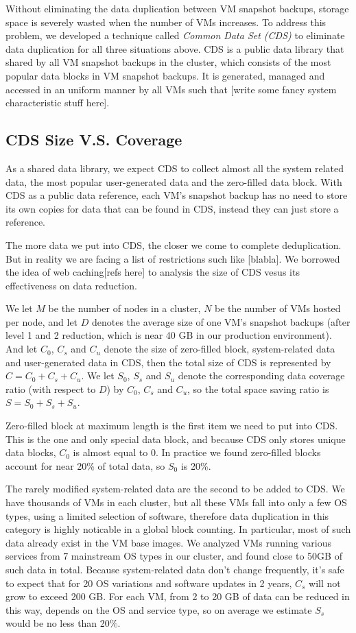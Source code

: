 Without eliminating the data duplication between VM snapshot backups, storage space is severely wasted when the number of VMs increases.
To address this problem, we developed a technique called \emph{Common Data Set (CDS)} to eliminate data duplication for all three situations above. 
CDS is a public data library that shared by all VM snapshot backups in the cluster, 
which consists of the most popular data blocks in VM snapshot backups. It is generated, 
managed and accessed in an uniform manner by all VMs such that [write some fancy system characteristic stuff here].

\subsection{CDS Size V.S. Coverage}
As a shared data library, we expect CDS to collect almost all the system related data, the most popular user-generated data and the zero-filled data block.
With CDS as a public data reference, each VM's snapshot backup has no need to store its own copies for data that can be found in CDS, instead they can just
store a reference.

The more data we put into CDS, the closer we come to complete deduplication. But in reality we are facing a list of restrictions such like [blabla].
We borrowed the idea of web caching[refs here] to analysis the size of CDS vesus its effectiveness on data reduction.

We let $M$ be the number of nodes in a cluster, $N$ be the number of VMs hosted per node,
and let $D$ denotes the average size of one VM's snapshot backups (after level 1 and 2 reduction, which is near 40 GB in our production environment).
And let $C_0$, $C_s$ and $C_u$ denote the size of zero-filled block, system-related data and user-generated data in CDS,
then the total size of CDS is represented by $C=C_0+C_s+C_u$.
We let $S_0$, $S_s$ and $S_u$ denote the corresponding data coverage ratio (with respect to $D$) by $C_0$, $C_s$ and $C_u$,
so the total space saving ratio is $S=S_0+S_s+S_u$.

Zero-filled block at maximum length is the first item we need to put into CDS. This is the one and only special data block, 
and because CDS only stores unique data blocks, $C_0$ is almost equal to 0. In practice we found zero-filled blocks account
for near 20\% of total data, so $S_0$ is 20\%.

The rarely modified system-related data are the second to be added to CDS. We have thousands of VMs in each cluster, 
but all these VMs fall into only a few OS types, using a limited selection of software, therefore data duplication in this category
is highly noticable in a global block counting. In particular, most of such data already exist in the VM base images. 
We analyzed VMs running various services from 7 mainstream OS types in our cluster, and found close to 50GB of such data in total. 
Because system-related data don't change frequently, it's safe to expect that for 20 OS variations 
and software updates in 2 years, $C_s$ will not grow to exceed 200 GB.
For each VM, from 2 to 20 GB of data can be reduced in this way, depends on the OS and service type, so on average we estimate
$S_s$ would be no less than 20\%.


